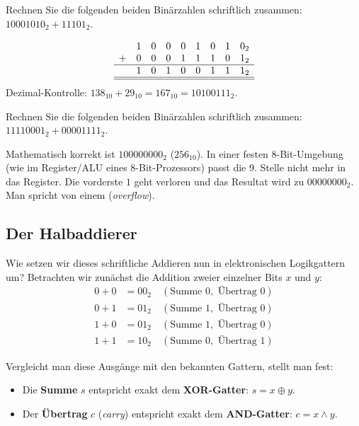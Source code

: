 \begin{myexercise}
	Rechnen Sie die folgenden beiden Binärzahlen schriftlich zusammen: $10001010_2 + 11101_2$.
	\begin{myanswer}
		\[
			\begin{array}{ccccccccc}
				  & 1 & 0 & 0 & 0 & 1 & 0 & 1 & 0_2 \\
				+ & 0 & 0 & 0 & 1 & 1 & 1 & 0 & 1_2 \\
				\hline
				  & 1 & 0 & 1 & 0 & 0 & 1 & 1 & 1_2 \\
				\hline\hline
			\end{array}
		\]
		Dezimal-Kontrolle: $138_{10} + 29_{10} = 167_{10} = 10100111_2$.
	\end{myanswer}
\end{myexercise}

\begin{myexercise}\label{myexercise:overflow}
	Rechnen Sie die folgenden beiden Binärzahlen schriftlich zusammen: $11110001_2 + 00001111_2$.
	\begin{myanswer}
		Mathematisch korrekt ist $100000000_2$ ($256_{10}$). In einer festen 8-Bit-Umgebung (wie im Register/ALU eines 8-Bit-Prozessors) passt die 9. Stelle nicht mehr in das Register. Die vorderste $1$ geht verloren und das Resultat wird zu $00000000_2$. Man spricht von einem  (\textit{overflow}).
	\end{myanswer}
\end{myexercise}

\subsection{Der Halbaddierer}

Wie setzen wir dieses schriftliche Addieren nun in elektronischen Logikgattern um? Betrachten wir zunächst die Addition zweier einzelner Bits $x$ und $y$:
\begin{align*}
    0 + 0 &= 00_2 \quad (\text{Summe } 0, \text{ Übertrag } 0) \\
    0 + 1 &= 01_2 \quad (\text{Summe } 1, \text{ Übertrag } 0) \\
    1 + 0 &= 01_2 \quad (\text{Summe } 1, \text{ Übertrag } 0) \\
    1 + 1 &= 10_2 \quad (\text{Summe } 0, \text{ Übertrag } 1)
\end{align*}

Vergleicht man diese Ausgänge mit den bekannten Gattern, stellt man fest:
\begin{itemize}
    \item Die \textbf{Summe} $s$ entspricht exakt dem \textbf{XOR-Gatter}: $s = x \oplus y$.
    \item Der \textbf{Übertrag} $c$ (\textit{carry}) entspricht exakt dem \textbf{AND-Gatter}: $c = x \land y$.
\end{itemize}

